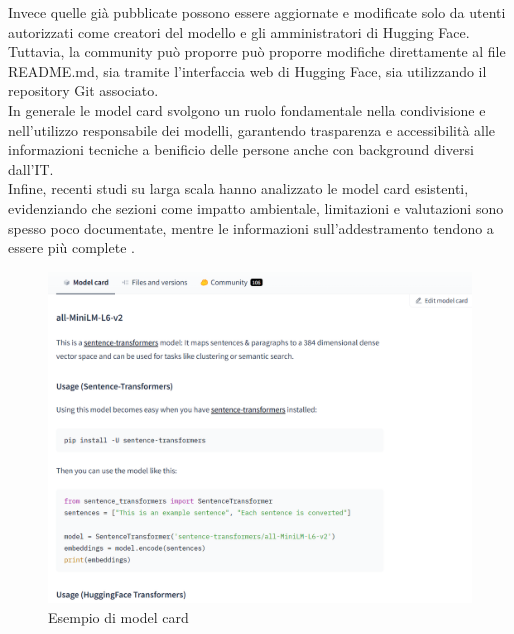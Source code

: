 \documentclass{article}
\begin{document}
Invece quelle già pubblicate possono essere aggiornate e modificate solo da utenti autorizzati come creatori del modello e gli amministratori di Hugging Face. Tuttavia, la community può proporre può proporre modifiche direttamente al file README.md, sia tramite l’interfaccia web di Hugging Face, sia utilizzando il repository Git associato.\\
In generale le model card svolgono un ruolo fondamentale nella condivisione e nell’utilizzo responsabile dei modelli, garantendo trasparenza e accessibilità alle informazioni tecniche a benificio delle persone anche con background diversi dall'IT.\\
Infine, recenti studi su larga scala hanno analizzato le model card esistenti, evidenziando che sezioni come impatto ambientale, limitazioni e valutazioni sono spesso poco documentate, mentre le informazioni sull’addestramento tendono a essere più complete \cite{liang2024whatsdocumentedaisystematic}.
\begin{figure}[htbp]
    \centering
    \includegraphics[width=.7\linewidth]{images/model_card.png}
    \caption{Esempio di model card}
    \label{fig:model_card_completa}
\end{figure}
\end{document}

